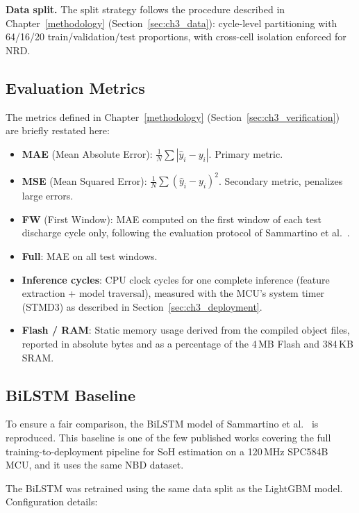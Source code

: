\textbf{Data split.} The split strategy follows the procedure described in Chapter~\ref{methodology} (Section~\ref{sec:ch3_data}): cycle-level partitioning with 64/16/20 train/validation/test proportions, with cross-cell isolation enforced for NRD.

\subsection{Evaluation Metrics}

The metrics defined in Chapter~\ref{methodology} (Section~\ref{sec:ch3_verification}) are briefly restated here:

\begin{itemize}
    \item \textbf{MAE} (Mean Absolute Error): $\frac{1}{N}\sum |\hat{y}_i - y_i|$. Primary metric.
    \item \textbf{MSE} (Mean Squared Error): $\frac{1}{N}\sum (\hat{y}_i - y_i)^2$. Secondary metric, penalizes large errors.
    \item \textbf{FW} (First Window): MAE computed on the first window of each test discharge cycle only, following the evaluation protocol of Sammartino et al.~\autocite{Sammartino2021}.
    \item \textbf{Full}: MAE on all test windows.
    \item \textbf{Inference cycles}: CPU clock cycles for one complete inference (feature extraction + model traversal), measured with the MCU's system timer (STMD3) as described in Section~\ref{sec:ch3_deployment}.
    \item \textbf{Flash / RAM}: Static memory usage derived from the compiled object files, reported in absolute bytes and as a percentage of the 4\,MB Flash and 384\,KB SRAM.
\end{itemize}

\subsection{BiLSTM Baseline}

To ensure a fair comparison, the BiLSTM model of Sammartino et al.~\autocite{Sammartino2021} is reproduced. This baseline is one of the few published works covering the full training-to-deployment pipeline for SoH estimation on a 120\,MHz SPC584B MCU, and it uses the same NBD dataset.

The BiLSTM was retrained using the same data split as the LightGBM model. Configuration details:


